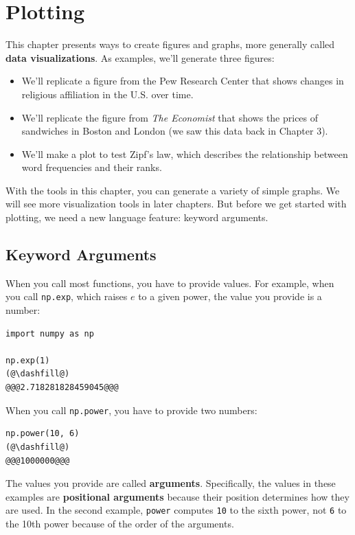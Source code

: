 \hypertarget{plotting}{%
\chapter{Plotting}\label{plotting}}

This chapter presents ways to create figures and graphs, more generally
called \textbf{data visualizations}. As examples, we'll generate three
figures:

\begin{itemize}
\item
  We'll replicate a figure from the Pew Research Center that shows
  changes in religious affiliation in the U.S. over time.
\item
  We'll replicate the figure from \emph{The Economist} that shows the
  prices of sandwiches in Boston and London (we saw this data back in
  Chapter 3).
\item
  We'll make a plot to test Zipf's law, which describes the relationship
  between word frequencies and their ranks.
\end{itemize}

With the tools in this chapter, you can generate a variety of simple
graphs. We will see more visualization tools in later chapters. But
before we get started with plotting, we need a new language feature:
keyword arguments.

\hypertarget{keyword-arguments}{%
\section{Keyword Arguments}\label{keyword-arguments}}

When you call most functions, you have to provide values. For example,
when you call \passthrough{\lstinline!np.exp!}, which raises \(e\) to a
given power, the value you provide is a number:

\begin{lstlisting}[]
import numpy as np

np.exp(1)
(@\dashfill@)
@@@2.718281828459045@@@
\end{lstlisting}

When you call \passthrough{\lstinline!np.power!}, you have to provide
two numbers:

\begin{lstlisting}[]
np.power(10, 6)
(@\dashfill@)
@@@1000000@@@
\end{lstlisting}

The values you provide are called \textbf{arguments}. Specifically, the
values in these examples are \textbf{positional arguments} because their
position determines how they are used. In the second example,
\passthrough{\lstinline!power!} computes \passthrough{\lstinline!10!} to
the sixth power, not \passthrough{\lstinline!6!} to the 10th power
because of the order of the arguments.

